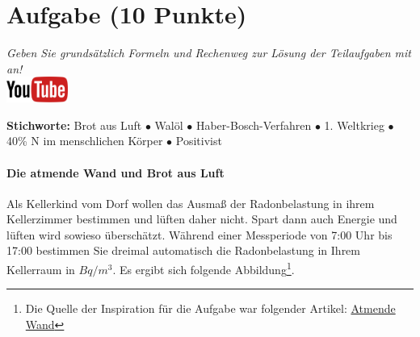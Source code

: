 \documentclass[a4paper, 9pt]{scrartcl}\usepackage[]{graphicx}\usepackage[]{xcolor}
\begin{document}
 
\clearpage

\section{Aufgabe \hfill (10 Punkte)}

\textit{Geben Sie grundsätzlich Formeln und Rechenweg zur L{\"o}sung der
  Teilaufgaben mit an!} \\[1Ex]

\hfill\href{https://youtu.be/4-dSaPMhK9s}{\includegraphics[width =
  2cm]{img/youtube}} %
\hspace{2Ex}

{\tiny\textbf{Stichworte:} Brot aus Luft $\bullet$ Walöl $\bullet$ Haber-Bosch-Verfahren $\bullet$ 1. Weltkrieg $\bullet$ 40\% N im menschlichen Körper $\bullet$ Positivist}

\paragraph{Die atmende Wand und Brot aus Luft}



Als Kellerkind vom Dorf wollen das Ausmaß der Radonbelastung in ihrem Kellerzimmer bestimmen und
lüften daher nicht. Spart dann auch Energie und lüften wird sowieso überschätzt. Während einer Messperiode von 7:00 Uhr bis
17:00 bestimmen Sie dreimal automatisch die Radonbelastung in
Ihrem Kellerraum in $Bq/m^3$. Es ergibt sich folgende Abbildung\footnote{Die Quelle der Inspiration
  für die Aufgabe war folgender Artikel:
  \href{https://de.wikipedia.org/wiki/Atmende_Wand}{Atmende Wand}}.
\end{document}
